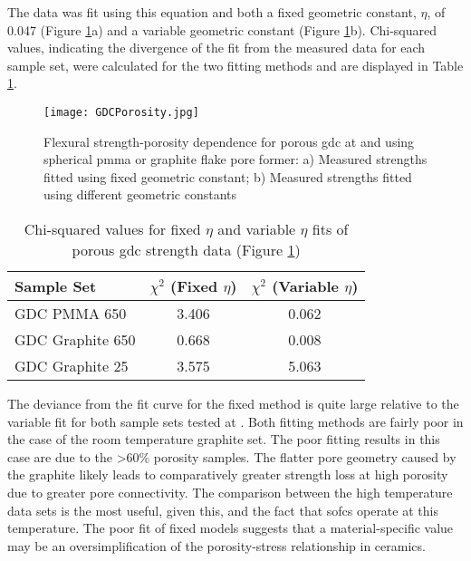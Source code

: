 The data was fit using this equation and both a fixed geometric constant, $\eta$, of 0.047 (Figure \ref{fig:gdcporsity}a) and a variable geometric constant (Figure \ref{fig:gdcporsity}b).
Chi-squared values, indicating the divergence of the fit from the measured data for each sample set, were calculated for the two fitting methods and are displayed in Table \ref{tab:porousgdcfit}.

\begin{figure}
    \texttt{[image: GDCPorosity.jpg]}
    \caption{Flexural strength-porosity dependence for porous \gls{gdc} at  and  using spherical \gls{pmma} or graphite flake pore former: a) Measured strengths fitted using fixed geometric constant; b) Measured strengths fitted using different geometric constants}
    \label{fig:gdcporsity}
\end{figure}

\begin{table}[b]
\centering
\caption{Chi-squared values for fixed $\eta$ and variable $\eta$ fits of porous \gls{gdc} strength data (Figure \ref{fig:gdcporsity})}
\label{tab:porousgdcfit}
\begin{tabular}{lcc}
Sample Set       & $\chi^2$ (Fixed $\eta$)  & $\chi^2$ (Variable $\eta$)   \\
\hline
GDC PMMA 650     & 3.406               & 0.062                   \\
GDC Graphite 650 & 0.668               & 0.008                   \\
GDC Graphite 25  & 3.575               & 5.063
\end{tabular}
\end{table}

The deviance from the fit curve for the fixed \texteta{} method is quite large relative to the variable \texteta{} fit for both sample sets tested at .
Both fitting methods are fairly poor in the case of the room temperature graphite set.
The poor fitting results in this case are due to the \textgreater{}60\% porosity samples.
The flatter pore geometry caused by the graphite likely leads to comparatively greater strength loss at high porosity due to greater pore connectivity.
The comparison between the high temperature data sets is the most useful, given this, and the fact that \glspl{sofc} operate at this temperature.
The poor fit of fixed \texteta{} models suggests that a material-specific \texteta{} value may be an oversimplification of the porosity-stress relationship in ceramics.

